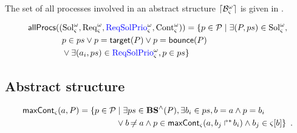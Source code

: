 \begin{comment}
\begin{definition}[$\uconcr: \powerset(\OS) \mapsto \powerset(\Sce)$]
\label{def:uconcr-set}
  $\uconcr(\Omega) = \{ \delta \in \uconcr(\w) \mid \w \in \Omega\}$
\end{definition}
\end{comment}

The set of all processes involved in an abstract structure $\lceil \mathcal{B}_\varsigma^\omega\rceil$ is given in .
\begin{definition} 
\label{def:allprocs}
  \begin{align*}
  &\mathsf{allProcs}((\mathrm{Sol}_\varsigma^\omega,\mathrm{Req}_\varsigma^\omega,\textcolor{blue}{\mathrm{ReqSolPrio}}_\varsigma^\omega,\mathrm{Cont}_\varsigma^\omega)) = \{ p \in \mathcal{P} \mid \exists (P,ps) \in \mathrm{Sol}_\varsigma^\omega, \\
    &\qquad\qquad p \in ps \vee p = \mathsf{target}(P) \vee p = \mathsf{bounce}(P) \\
    &\qquad\qquad \vee \exists (a_i,ps) \in \textcolor{blue}{\mathrm{ReqSolPrio}}_\varsigma^\omega, p \in ps \}
  \end{align*}
\end{definition}



\subsection{Abstract structure}


\begin{definition}[$\gCont_\ctx : \Sigma \times \Obj \mapsto \powerset(\PHproc)$]
  \label{def:maxCont}
  \begin{align*}
    \mathsf{maxCont}_\varsigma(a,P) = 
    \{ p \in \mathcal{P} &\mid \exists ps \in \mathbf{BS}^\wedge(P), \exists b_i \in ps, b = a \wedge p = b_i \\
      & \vee b \not\nobreak\mkern -2mu = a \wedge p \in \mathsf{maxCont}_\varsigma(a, \mbox{$b_j\Rsh^*\!b_i$}) \wedge b_j \in {\varsigma[b]} \}
    \enspace.
  \end{align*}
\end{definition}

